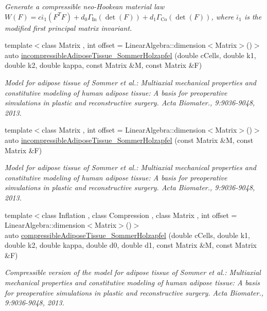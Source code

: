 \begin{DoxyCompactItemize}
\begin{DoxyCompactList}\small\item\em Generate a compressible neo-\/\-Hookean material law $ W(F)=c\bar\iota_1(F^T F)+d_0\Gamma_\mathrm{In}(\det(F))+d_1\Gamma_\mathrm{Co}(\det(F)) $, where $\bar\iota_1$ is the modified first principal matrix invariant. \end{DoxyCompactList}\item 
{\footnotesize template$<$class Matrix , int offset = Linear\-Algebra\-::dimension$<$\-Matrix$>$()$>$ }\\auto \hyperlink{group__Biomechanics_gac269eefc1abb994044e1634c20a98061}{incompressible\-Adipose\-Tissue\-\_\-\-Sommer\-Holzapfel} (double c\-Cells, double k1, double k2, double kappa, const Matrix \&M, const Matrix \&F)
\begin{DoxyCompactList}\small\item\em Model for adipose tissue of Sommer et al.\-: Multiaxial mechanical properties and constitutive modeling of human adipose tissue\-: A basis for preoperative simulations in plastic and reconstructive surgery. Acta Biomater., 9\-:9036-\/9048, 2013. \end{DoxyCompactList}\item 
{\footnotesize template$<$class Matrix , int offset = Linear\-Algebra\-::dimension$<$\-Matrix$>$()$>$ }\\auto \hyperlink{group__Biomechanics_ga01ab128bcf179f4431b0270179af9e20}{incompressible\-Adipose\-Tissue\-\_\-\-Sommer\-Holzapfel} (const Matrix \&M, const Matrix \&F)
\begin{DoxyCompactList}\small\item\em Model for adipose tissue of Sommer et al.\-: Multiaxial mechanical properties and constitutive modeling of human adipose tissue\-: A basis for preoperative simulations in plastic and reconstructive surgery. Acta Biomater., 9\-:9036-\/9048, 2013. \end{DoxyCompactList}\item 
{\footnotesize template$<$class Inflation , class Compression , class Matrix , int offset = Linear\-Algebra\-::dimension$<$\-Matrix$>$()$>$ }\\auto \hyperlink{group__Biomechanics_ga5c3388564c0420b62e58f48c739d27f1}{compressible\-Adipose\-Tissue\-\_\-\-Sommer\-Holzapfel} (double c\-Cells, double k1, double k2, double kappa, double d0, double d1, const Matrix \&M, const Matrix \&F)
\begin{DoxyCompactList}\small\item\em Compressible version of the model for adipose tissue of Sommer et al.\-: Multiaxial mechanical properties and constitutive modeling of human adipose tissue\-: A basis for preoperative simulations in plastic and reconstructive surgery. Acta Biomater., 9\-:9036-\/9048, 2013. \end{DoxyCompactList}\item 

\end{DoxyCompactItemize}
